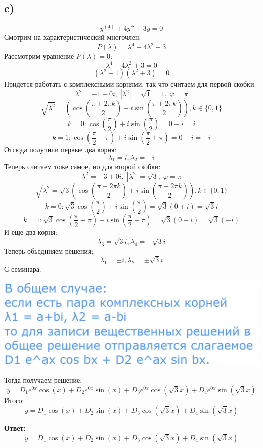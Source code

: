 \documentclass[a4paper, 12pt]{article}
\begin{document}
\subsection*{c)}
\[
y^{(4)} + 4y'' +3y = 0
\]
Смотрим на характеристический многочлен:
\[
P(\lambda) = \lambda^4 + 4\lambda^2 + 3
\]
Рассмотрим уравнение $P(\lambda) = 0$:
\[
\lambda^4 + 4\lambda^2 + 3 = 0
\]
\[
(\lambda^2 + 1)(\lambda^2 + 3) = 0
\]
Придется работать с комплексными корнями, так что считаем для первой скобки:
\[
\lambda^2 = - 1 + 0i,  \;
|\lambda^2| = \sqrt{1} = 1,  \;
 \varphi = \pi 
\]
\[
\sqrt{\lambda^2} = 
\left(
\cos 
\left(
\frac{\pi + 2 \pi k}{2}
\right)
+i
\sin
\left(
\frac{\pi + 2 \pi k}{2}
\right)
\right), k \in \{0, 1\}
\]
\[
k = 0 : \cos \left(\frac{\pi}{2}\right) + i\sin \left(\frac{\pi}{2}\right)  = 0 + i = i
\]
\[
k = 1 : \cos \left(\frac{\pi}{2} + \pi \right) + i\sin \left(\frac{\pi}{2}+\pi \right) = 0 - i = -i
\]
Отсюда получили первые два корня:
\[
\lambda_1 = i, \lambda_2 = -i
\]
Теперь считаем тоже самое, но для второй скобки:
\[
\lambda^2 = -3 + 0i,  \;
|\lambda^2| = \sqrt{3}, \;
\varphi = \pi 
\]
\[
\sqrt{\lambda^2} = 
\sqrt{3}
\left(
\cos 
\left(
\frac{\pi + 2 \pi k}{2}
\right)
+i
\sin
\left(
\frac{\pi + 2 \pi k}{2}
\right)
\right), k \in \{0, 1\}
\]
\[
k = 0 :\sqrt{3} \cos \left(\frac{\pi}{2}\right) + i\sin \left(\frac{\pi}{2}\right)  = \sqrt{3}(0 + i) =\sqrt{3} i
\]
\[
k = 1 :\sqrt{3} \cos \left(\frac{\pi}{2} + \pi \right) + i\sin \left(\frac{\pi}{2}+\pi \right) = \sqrt{3}(0 - i) = \sqrt{3}(-i)
\]
И еще два корня:
\[
\lambda_3 = \sqrt{3}i, \lambda_4 = -\sqrt{3}i
\]
Теперь обьединяем решения:
\[
\lambda_1 = \pm i, \lambda_2 = \pm \sqrt{3} i
\]
С семинара:
\begin{center}
\includegraphics[scale=0.2]{1.png}
\end{center}
Тогда получаем решение:
\[
y = D_1 e^{0x} \cos(x) + D_2 e^{0x} \sin(x) +  D_3 e^{0x} \cos(\sqrt{3}x) +  D_4 e^{0x} \sin(\sqrt{3}x)
\]
Итого:
\[
y = D_1 \cos(x) + D_2\sin(x) +  D_3 \cos(\sqrt{3}x) +  D_4  \sin(\sqrt{3}x)
\]
\begin{center}
\textbf{Ответ: } 
\[
y = D_1 \cos(x) + D_2\sin(x) +  D_3 \cos(\sqrt{3}x) +  D_4  \sin(\sqrt{3}x)
\]
\end{center}
\clearpage
\end{document}
